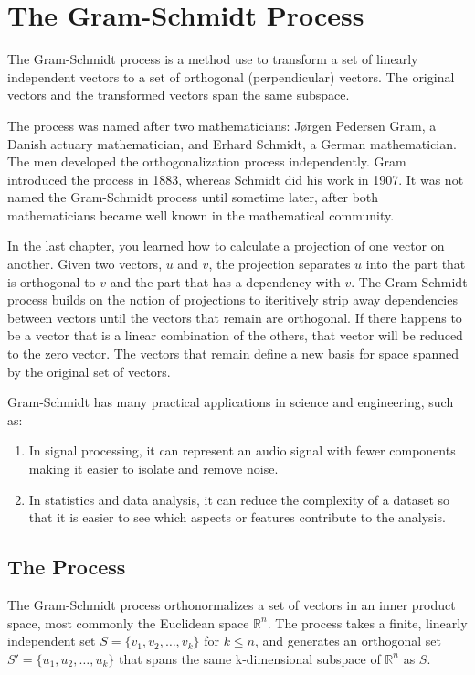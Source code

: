 \chapter{The Gram-Schmidt Process}

The Gram-Schmidt process is a method use to transform a set of linearly independent vectors to a set of orthogonal (perpendicular) vectors. The original vectors and the transformed vectors span the same subspace. 

The process was named after two mathematicians: Jørgen Pedersen Gram, a Danish actuary mathematician, and Erhard Schmidt, a German mathematician. The men developed the orthogonalization process independently. Gram introduced the process in 1883, whereas Schmidt did his work in 1907.  It was not named the Gram-Schmidt process until sometime later, after both mathematicians became well known in the mathematical community.

In the last chapter, you learned how to calculate a projection of one vector on another. Given two vectors, $u$ and $v$, the projection separates $u$ into the part that is orthogonal to $v$ and the part that has a dependency with $v$. The Gram-Schmidt process builds on the notion of projections to iteritively strip away dependencies between vectors until the vectors that remain are orthogonal. If there happens to be a vector that is a linear combination of the others, that vector will be reduced to the zero vector. The vectors that remain define a new basis for space spanned by the original set of vectors. 

Gram-Schmidt has many practical applications in science and engineering, such as:
\begin{enumerate}
\item In signal processing, it can represent an audio signal with fewer components making it easier to isolate and remove noise. 
\item In statistics and data analysis, it can reduce the complexity of a dataset so that it is easier to see which aspects or features contribute to the analysis. 
\end{enumerate}

\section{The Process}

The Gram-Schmidt process orthonormalizes a set of vectors in an inner product space, most commonly the Euclidean space
$\mathbb{R}^n$. The process takes a finite, linearly independent set
$S = \{v_1, v_2, \ldots, v_k\}$ for $k \leq n$, and generates an
orthogonal set $S' = \{u_1, u_2, \ldots, u_k\}$ that spans the same
k-dimensional subspace of $\mathbb{R}^n$ as $S$.

